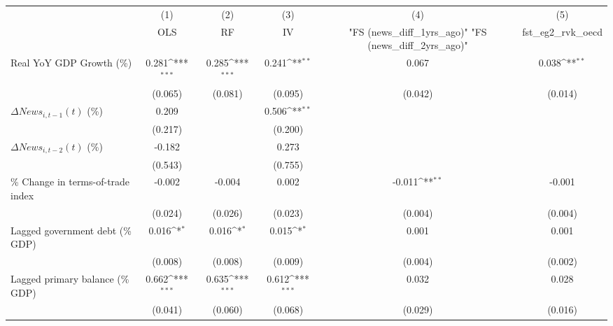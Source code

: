 {
\def\sym#1{\ifmmode^{#1}\else\(^{#1}\)\fi}
\begin{tabular}{l*{5}{c}}
\toprule
                    &\multicolumn{1}{c}{(1)}&\multicolumn{1}{c}{(2)}&\multicolumn{1}{c}{(3)}&\multicolumn{1}{c}{(4)}&\multicolumn{1}{c}{(5)}\\
                    &\multicolumn{1}{c}{OLS}&\multicolumn{1}{c}{RF}&\multicolumn{1}{c}{IV}&\multicolumn{1}{c}{ "FS (news_diff_1yrs_ago)"  "FS (news_diff_2yrs_ago)" }&\multicolumn{1}{c}{fst_eg2_rvk_oecd}\\
\midrule
Real YoY GDP Growth (\%)&       0.281\sym{***}&       0.285\sym{***}&       0.241\sym{**} &       0.067         &       0.038\sym{**} \\
                    &     (0.065)         &     (0.081)         &     (0.095)         &     (0.042)         &     (0.014)         \\
\addlinespace
$ \Delta News_{i,t-1}(t)$ (\%)&       0.209         &                     &       0.506\sym{**} &                     &                     \\
                    &     (0.217)         &                     &     (0.200)         &                     &                     \\
\addlinespace
$ \Delta News_{i,t-2}(t)$ (\%)&      -0.182         &                     &       0.273         &                     &                     \\
                    &     (0.543)         &                     &     (0.755)         &                     &                     \\
\addlinespace
\% Change in terms-of-trade index&      -0.002         &      -0.004         &       0.002         &      -0.011\sym{**} &      -0.001         \\
                    &     (0.024)         &     (0.026)         &     (0.023)         &     (0.004)         &     (0.004)         \\
\addlinespace
Lagged government debt (\% GDP)&       0.016\sym{*}  &       0.016\sym{*}  &       0.015\sym{*}  &       0.001         &       0.001         \\
                    &     (0.008)         &     (0.008)         &     (0.009)         &     (0.004)         &     (0.002)         \\
\addlinespace
Lagged primary balance (\% GDP)&       0.662\sym{***}&       0.635\sym{***}&       0.612\sym{***}&       0.032         &       0.028         \\
                    &     (0.041)         &     (0.060)         &     (0.068)         &     (0.029)         &     (0.016)         \\

\end{tabular}}
